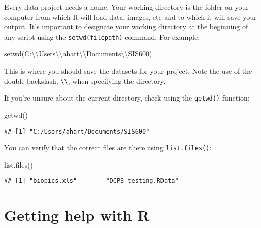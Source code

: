 \documentclass[
  12pt,
]{krantz}
\newenvironment{Shaded}{\begin{snugshade}}{\end{snugshade}}
\newcommand{\FunctionTok}[1]{\textcolor[rgb]{0.00,0.00,0.00}{#1}}
\newcommand{\NormalTok}[1]{#1}
\newcommand{\SpecialCharTok}[1]{\textcolor[rgb]{0.00,0.00,0.00}{#1}}
\newcommand{\StringTok}[1]{\textcolor[rgb]{0.31,0.60,0.02}{#1}}
\begin{document}
Every data project needs a home. Your working directory is the folder on your computer from which R will load data, images, etc and to which it will save your output. It's important to designate your working directory at the beginning of any script using the \texttt{setwd(\textquotesingle{}filepath\textquotesingle{})} command. For example:

\begin{Shaded}
\begin{Highlighting}[]
  \FunctionTok{setwd}\NormalTok{(}\StringTok{\textquotesingle{}C:}\SpecialCharTok{\textbackslash{}\textbackslash{}}\StringTok{Users}\SpecialCharTok{\textbackslash{}\textbackslash{}}\StringTok{ahart}\SpecialCharTok{\textbackslash{}\textbackslash{}}\StringTok{Documents}\SpecialCharTok{\textbackslash{}\textbackslash{}}\StringTok{SIS600\textquotesingle{}}\NormalTok{)}
\end{Highlighting}
\end{Shaded}

This is where you should save the datasets for your project. Note the use of the double backslash, \texttt{\textbackslash{}\textbackslash{}}, when specifying the directory.

If you're unsure about the current directory, check using the \texttt{getwd()} function:

\begin{Shaded}
\begin{Highlighting}[]
  \FunctionTok{getwd}\NormalTok{()}
\end{Highlighting}
\end{Shaded}

\begin{verbatim}
## [1] "C:/Users/ahart/Documents/SIS600"
\end{verbatim}

You can verify that the correct files are there using \texttt{list.files()}:

\begin{Shaded}
\begin{Highlighting}[]
  \FunctionTok{list.files}\NormalTok{()}
\end{Highlighting}
\end{Shaded}

\begin{verbatim}
## [1] "biopics.xls"        "DCPS testing.RData"
\end{verbatim}

\hypertarget{getting-help-with-r}{%
\section{Getting help with R}\label{getting-help-with-r}}
\end{document}
